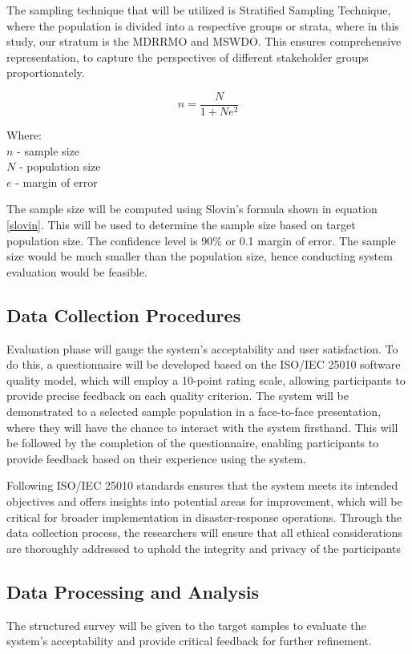 	The sampling technique that will be utilized is Stratified Sampling Technique, where the population is divided into a respective groups or strata, where in this study, our stratum is the MDRRMO and MSWDO. This ensures comprehensive representation, to capture the perspectives of different stakeholder groups proportionately.
	
	\begin{equation} 
		\label{slovin}
		n = \frac{N}{1+Ne^2}
	\end{equation}
	
	Where:
	\\$n$ - sample size
	\\$N$ - population size
	\\$e$ - margin of error
 	
	The sample size will be computed using Slovin's formula shown in equation \ref{slovin}. This will be used to determine the sample size based on target population size. The confidence level is 90\% or 0.1 margin of error. The sample size would be much smaller than the population size, hence conducting system evaluation  would be feasible.

\subsection{Data Collection Procedures}
	Evaluation phase will gauge the system’s acceptability and user satisfaction. To do this, a questionnaire will be developed based on the ISO/IEC 25010 software quality model, which will employ a 10-point rating scale, allowing participants to provide precise feedback on each quality criterion. The system will be demonstrated to a selected sample population in a face-to-face presentation, where they will have the chance to interact with the system firsthand. This will be followed by the completion of the questionnaire, enabling participants to provide feedback based on their experience using the system.
	
	Following ISO/IEC 25010 standards ensures that the system meets its intended objectives and offers insights into potential areas for improvement, which will be critical for broader implementation in disaster-response operations. Through the data collection process, the researchers will ensure that all ethical considerations are thoroughly addressed to uphold the integrity and privacy of the participants

\subsection{Data Processing and Analysis}
	The structured survey will be given to the target samples to evaluate the system's acceptability and provide critical feedback for further refinement.
	
